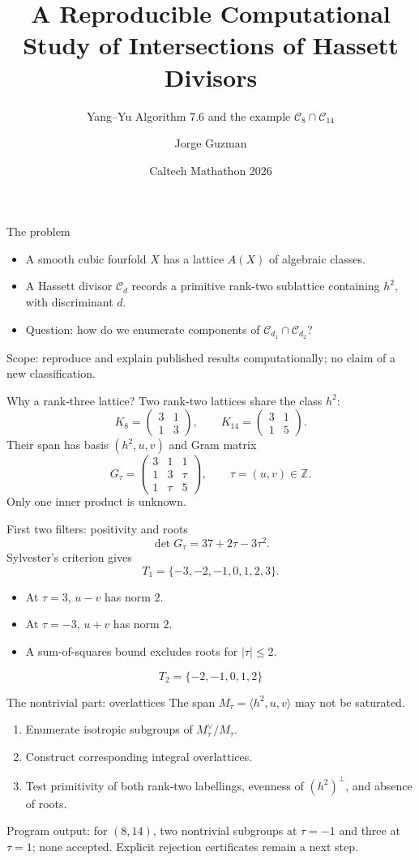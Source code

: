 \documentclass[aspectratio=169,11pt]{beamer}
\title{A Reproducible Computational Study of Intersections of Hassett Divisors}
\subtitle{Yang--Yu Algorithm 7.6 and the example $\mathcal C_8\cap\mathcal C_{14}$}
\author{Jorge Guzman}
\date{Caltech Mathathon 2026}
\begin{document}
\begin{frame}\titlepage\end{frame}
\begin{frame}{The problem}
\begin{itemize}\item A smooth cubic fourfold $X$ has a lattice $A(X)$ of algebraic classes.\item A Hassett divisor $\mathcal C_d$ records a primitive rank-two sublattice containing $h^2$, with discriminant $d$.\item Question: how do we enumerate components of $\mathcal C_{d_1}\cap\mathcal C_{d_2}$?\end{itemize}
\vspace{0.5em}\alert{Scope:} reproduce and explain published results computationally; no claim of a new classification.
\end{frame}
\begin{frame}{Why a rank-three lattice?}
Two rank-two lattices share the class $h^2$:
\[K_8=\begin{pmatrix}3&1\\1&3\end{pmatrix},\qquad K_{14}=\begin{pmatrix}3&1\\1&5\end{pmatrix}.\]
Their span has basis $(h^2,u,v)$ and Gram matrix
\[G_\tau=\begin{pmatrix}3&1&1\\1&3&\tau\\1&\tau&5\end{pmatrix},\qquad \tau=(u,v)\in\mathbb Z.\]
Only one inner product is unknown.
\end{frame}
\begin{frame}{First two filters: positivity and roots}
\[\det G_\tau=37+2\tau-3\tau^2.\]
Sylvester's criterion gives
\[T_1=\{-3,-2,-1,0,1,2,3\}.\]
\begin{itemize}\item At $\tau=3$, $u-v$ has norm $2$.\item At $\tau=-3$, $u+v$ has norm $2$.\item A sum-of-squares bound excludes roots for $|\tau|\le2$.\end{itemize}
\[\boxed{T_2=\{-2,-1,0,1,2\}}\]
\end{frame}
\begin{frame}{The nontrivial part: overlattices}
The span $M_\tau=\langle h^2,u,v\rangle$ may not be saturated.
\begin{enumerate}\item Enumerate isotropic subgroups of $M_\tau^\vee/M_\tau$.\item Construct corresponding integral overlattices.\item Test primitivity of both rank-two labellings, evenness of $(h^2)^\perp$, and absence of roots.\end{enumerate}
\alert{Program output:} for $(8,14)$, two nontrivial subgroups at $\tau=-1$ and three at $\tau=1$; none accepted. Explicit rejection certificates remain a next step.
\end{frame}
\end{document}
